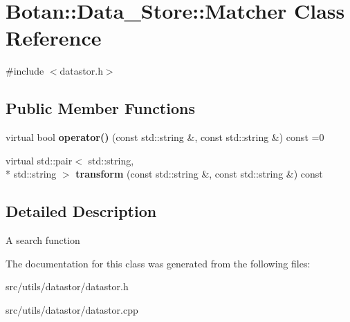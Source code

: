 \hypertarget{classBotan_1_1Data__Store_1_1Matcher}{\section{Botan\-:\-:Data\-\_\-\-Store\-:\-:Matcher Class Reference}
\label{classBotan_1_1Data__Store_1_1Matcher}
}


{\ttfamily \#include $<$datastor.\-h$>$}

\subsection*{Public Member Functions}
\begin{DoxyCompactItemize}
\item 
\hypertarget{classBotan_1_1Data__Store_1_1Matcher_af841f2cb2df329b5c9d7a8d79bd0b3fa}{virtual bool {\bfseries operator()} (const std\-::string \&, const std\-::string \&) const =0}\label{classBotan_1_1Data__Store_1_1Matcher_af841f2cb2df329b5c9d7a8d79bd0b3fa}

\item 
\hypertarget{classBotan_1_1Data__Store_1_1Matcher_a546e55f4aafdda74efd9cb855dd36711}{virtual std\-::pair$<$ std\-::string, \\*
std\-::string $>$ {\bfseries transform} (const std\-::string \&, const std\-::string \&) const }\label{classBotan_1_1Data__Store_1_1Matcher_a546e55f4aafdda74efd9cb855dd36711}

\end{DoxyCompactItemize}


\subsection{Detailed Description}
A search function 

The documentation for this class was generated from the following files\-:\begin{DoxyCompactItemize}
\item 
src/utils/datastor/datastor.\-h\item 
src/utils/datastor/datastor.\-cpp\end{DoxyCompactItemize}
